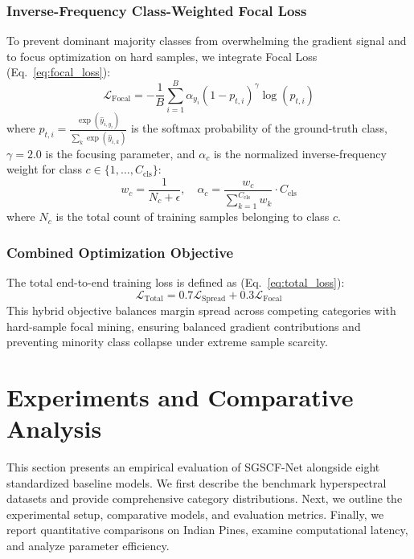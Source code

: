 \documentclass[manuscript,screen,review]{acmart}
\begin{document}
\subsubsection{Inverse-Frequency Class-Weighted Focal Loss}
To prevent dominant majority classes from overwhelming the gradient signal and to focus optimization on hard samples, we integrate Focal Loss (Eq.~\ref{eq:focal_loss}):
\begin{equation}
\label{eq:focal_loss}
\mathcal{L}_{\text{Focal}} = -\frac{1}{B} \sum_{i=1}^B \alpha_{y_i} (1 - p_{t, i})^\gamma \log(p_{t, i})
\end{equation}
where $p_{t, i} = \frac{\exp(\hat{y}_{i, y_i})}{\sum_k \exp(\hat{y}_{i, k})}$ is the softmax probability of the ground-truth class, $\gamma = 2.0$ is the focusing parameter, and $\alpha_c$ is the normalized inverse-frequency weight for class $c \in \{1, \dots, C_{\text{cls}}\}$:
\begin{equation}
\label{eq:class_weights}
w_c = \frac{1}{N_c + \epsilon}, \quad \alpha_c = \frac{w_c}{\sum_{k=1}^{C_{\text{cls}}} w_k} \cdot C_{\text{cls}}
\end{equation}
where $N_c$ is the total count of training samples belonging to class $c$.

\subsubsection{Combined Optimization Objective}
The total end-to-end training loss is defined as (Eq.~\ref{eq:total_loss}):
\begin{equation}
\label{eq:total_loss}
\mathcal{L}_{\text{Total}} = 0.7 \mathcal{L}_{\text{Spread}} + 0.3 \mathcal{L}_{\text{Focal}}
\end{equation}
This hybrid objective balances margin spread across competing categories with hard-sample focal mining, ensuring balanced gradient contributions and preventing minority class collapse under extreme sample scarcity.

\newpage
\section{Experiments and Comparative Analysis}
\label{sec:experiments}
This section presents an empirical evaluation of SGSCF-Net alongside eight standardized baseline models. We first describe the benchmark hyperspectral datasets and provide comprehensive category distributions. Next, we outline the experimental setup, comparative models, and evaluation metrics. Finally, we report quantitative comparisons on Indian Pines, examine computational latency, and analyze parameter efficiency.
\end{document}
